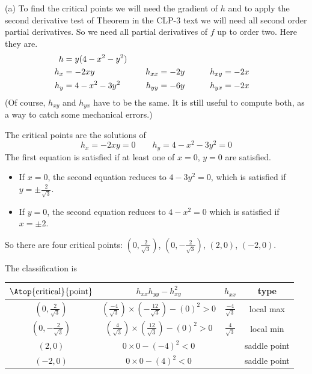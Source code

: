 \begin{solution}
(a)
To find the critical points we will need the
gradient of $h$ and to apply the second derivative test of 
Theorem  in the CLP-3 text 
we will need all 
second order partial derivatives. So we need all partial derivatives of
$f$ up to order two.
Here they are.
\begin{alignat*}{3}
h&=y(4 - x^2 - y^2) \hidewidth\\
h_x&=-2xy   & h_{xx}&=-2y \qquad & h_{xy}&= -2x\\
h_y&=4-x^2-3y^2 \qquad & h_{yy}&=-6y\qquad & h_{yx}&= -2x
\end{alignat*}
(Of course, $h_{xy}$ and $h_{yx}$ have to be the same. It is still
useful to compute both, as a way to catch some mechanical errors.)

The critical points are the solutions of
\begin{equation*}
h_x=-2xy=0   \qquad
h_y=4-x^2-3y^2 = 0
\end{equation*}
The first equation is satisfied if at least one of $x=0$, $y=0$
are satisfied.
\begin{itemize}
\item 
If $x=0$, the second equation reduces to $4-3y^2=0$, which is
satisfied if $y=\pm\frac{2}{\sqrt{3}}$.
\item 
If $y=0$, the second equation reduces to $4-x^2=0$
which is satisfied if $x=\pm 2$.
\end{itemize}
So there are four critical points: 
   $\left(0,\frac{2}{\sqrt{3}}\right)$, $\left(0,-\frac{2}{\sqrt{3}}\right)$, 
   $(2,0)$, $(-2,0)$.


The classification is
\begin{center}
\renewcommand{\arraystretch}{1.3}
     \begin{tabular}{|c|c|c|c|}
     \hline
    $\Atop{\text{critical}}{\text{point}}$  & $h_{xx}h_{yy}-h_{xy}^2$ & 
                                                          $h_{xx}$ & type \\    
    \hline
     $\left(0,\frac{2}{\sqrt{3}}\right)$  
            & $\left(\frac{-4}{\sqrt{3}}\right)\times 
               \left(-\frac{12}{\sqrt{3}}\right)-(0)^2> 0$ 
           & $\frac{-4}{\sqrt{3}}$  & local max  \\ \hline
     $\left(0,-\frac{2}{\sqrt{3}}\right)$  
            & $\left(\frac{4}{\sqrt{3}}\right)\times 
                \left(\frac{12}{\sqrt{3}}\right)-(0)^2>0$ 
            & $\frac{4}{\sqrt{3}}$  & local min \\  \hline
     $(2,0)$  & $0\times 0-(-4)^2<0$ &   & saddle point \\  \hline
     $(-2,0)$  & $0\times 0-(4)^2<0$ &   & saddle point \\  \hline
     \end{tabular}
\renewcommand{\arraystretch}{1.0}
\end{center}


\end{solution}
